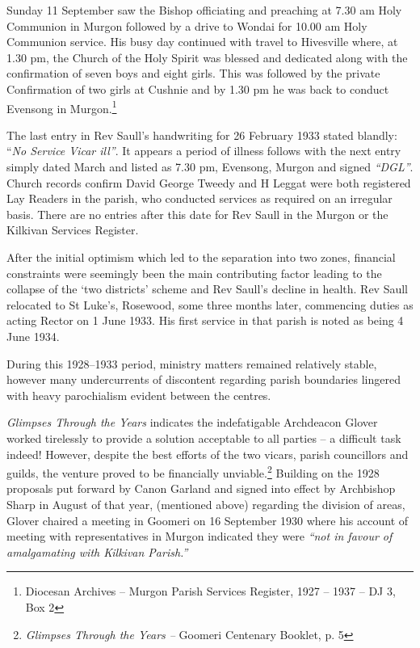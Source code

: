 Sunday 11 September saw the Bishop officiating and preaching at 7.30 am Holy Communion in Murgon followed by a drive to Wondai for 10.00 am Holy Communion service. His busy day continued with travel to Hivesville where, at 1.30 pm, the Church of the Holy Spirit was blessed and dedicated along with the confirmation of seven boys and eight girls. This was followed by the private Confirmation of two girls at Cushnie and by 1.30 pm he was back to conduct Evensong in Murgon.\footnote{Diocesan Archives -- Murgon Parish Services Register, 1927 -- 1937 -- DJ 3, Box 2}


The last entry in Rev Saull's handwriting for 26 February 1933 stated blandly: ``\emph{No Service Vicar ill''}. It appears a period of illness follows with the next entry simply dated March and listed as 7.30 pm, Evensong, Murgon and signed \emph{``DGL''}. Church records confirm David George Tweedy and H Leggat were both registered Lay Readers in the parish, who conducted services as required on an irregular basis. There are no entries after this date for Rev Saull in the Murgon or the Kilkivan Services Register.



After the initial optimism which led to the separation into two zones, financial constraints were seemingly been the main contributing factor leading to the collapse of the `two districts' scheme and Rev Saull's decline in health. Rev Saull relocated to St Luke's, Rosewood, some three months later, commencing duties as acting Rector on 1 June 1933. His first service in that parish is noted as being 4 June 1934.



During this 1928--1933 period, ministry matters remained relatively stable, however many undercurrents of discontent regarding parish boundaries lingered with heavy parochialism evident between the centres.



\emph{Glimpses Through the Years} indicates the indefatigable Archdeacon Glover worked tirelessly to provide a solution acceptable to all parties -- a difficult task indeed! However, despite the best efforts of the two vicars, parish councillors and guilds, the venture proved to be financially unviable.\footnote{\emph{Glimpses Through the Years --} Goomeri Centenary Booklet, p. 5} Building on the 1928 proposals put forward by Canon Garland and signed into effect by Archbishop Sharp in August of that year, (mentioned above) regarding the division of areas, Glover chaired a meeting in Goomeri on 16 September 1930 where his account of meeting with representatives in Murgon indicated they were \emph{``not in favour of amalgamating with Kilkivan Parish.''}


